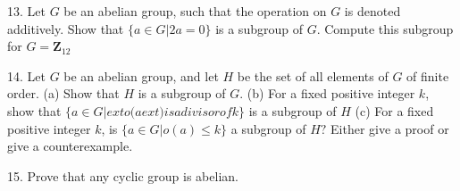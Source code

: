 \begin{mdframed}[style=darkAnswer,frametitle={Joe Starr}]
    
\end{mdframed}
\newpage
\begin{mdframed}[style=darkQuesion]
  13. Let $G$ be an abelian group, such that the operation on $G$ is denoted additively. Show that $\{a \in G | 2 a=0\}$ is a subgroup of $G .$ Compute this subgroup for $G=\mathbf{Z}_{12}$
    
\end{mdframed}

\begin{mdframed}[style=darkAnswer,frametitle={Joe Starr}]
    
\end{mdframed}
\newpage
\begin{mdframed}[style=darkQuesion]
  14. Let $G$ be an abelian group, and let $H$ be the set of all elements of $G$ of finite order.
  (a) Show that $H$ is a subgroup of $G .$
  (b) For a fixed positive integer $k$, show that $\{a \in G |   ext { o( } a   ext { ) is a divisor of } k\}$ is a subgroup of $H$
  (c) For a fixed positive integer $k$, is $\{a \in G | o(a) \leq k\}$ a subgroup of $H ?$ Either give a proof or give a counterexample.
    
\end{mdframed}

\begin{mdframed}[style=darkAnswer,frametitle={Joe Starr}]
    
\end{mdframed}
\newpage
\begin{mdframed}[style=darkQuesion]
  15. Prove that any cyclic group is abelian.
\end{mdframed}

